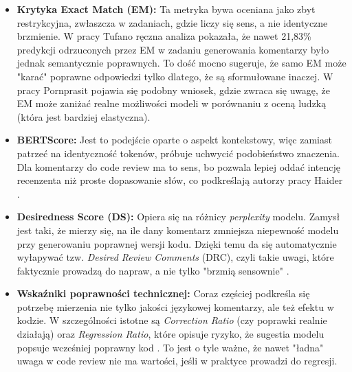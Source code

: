 \begin{itemize}
    \item \textbf{Krytyka Exact Match (EM):} Ta metryka bywa oceniana jako zbyt restrykcyjna, 
zwłaszcza w zadaniach, gdzie liczy się sens, a nie identyczne brzmienie. 
W pracy Tufano \cite{Tufano2024CodeReviewAutomation} ręczna analiza pokazała, że nawet 21,83\% predykcji odrzuconych przez 
EM w zadaniu generowania komentarzy było jednak semantycznie poprawnych. To dość mocno sugeruje, że samo EM może 
"karać" poprawne odpowiedzi tylko dlatego, że są sformułowane inaczej. 
W pracy Pornprasit \cite{Pornprasit2024FineTuningPromptingCR} pojawia się podobny wniosek, gdzie zwraca się uwagę, że 
EM może zaniżać realne możliwości modeli w porównaniu z oceną ludzką (która jest bardziej elastyczna).
    
    \item \textbf{BERTScore:} Jest to podejście oparte o aspekt kontekstowy, więc zamiast patrzeć 
na identyczność tokenów, próbuje uchwycić podobieństwo znaczenia. Dla komentarzy do code review ma to sens, bo pozwala lepiej 
oddać intencję recenzenta niż proste dopasowanie słów, co podkreślają autorzy pracy Haider \cite{Haider2024PromptingFineTuningRCG}.
    
    \item \textbf{Desiredness Score (DS):} Opiera się na różnicy \textit{perplexity} modelu.
Zamysł jest taki, że mierzy się, na ile dany komentarz zmniejsza niepewność modelu przy generowaniu poprawnej wersji kodu.
Dzięki temu da się automatycznie wyłapywać tzw. \textit{Desired Review Comments} (DRC), czyli takie uwagi, które faktycznie prowadzą do 
napraw, a nie tylko "brzmią sensownie" \cite{Yu2025Desiview}.
    
    \item \textbf{Wskaźniki poprawności technicznej:} Coraz częściej podkreśla się potrzebę mierzenia nie tylko 
jakości językowej komentarzy, ale też efektu w kodzie. W szczególności istotne są \textit{Correction Ratio} (czy poprawki realnie działają)
oraz \textit{Regression Ratio}, które opisuje ryzyko, że sugestia modelu popsuje wcześniej poprawny
kod \cite{Cihan2025EvaluatingLLMsForCodeReview}. To jest o tyle ważne, że nawet "ładna" uwaga w code review nie ma wartości,
jeśli w praktyce prowadzi do regresji.
\end{itemize}

